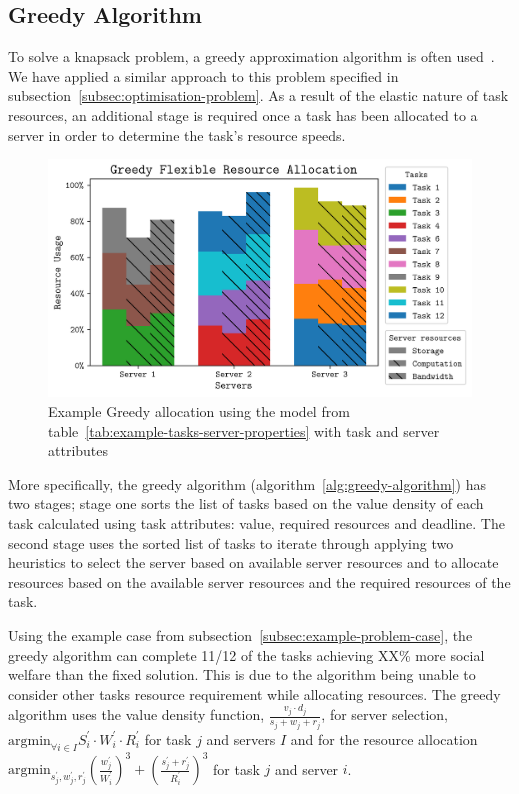 \subsection{Greedy Algorithm}
\label{subsec:greedy-algorithm}
To solve a knapsack problem, a greedy approximation algorithm is often used~\cite{sahni1975approximate}. We have
applied a similar approach to this problem specified in subsection~\ref{subsec:optimisation-problem}. As a result of
the elastic nature of task resources, an additional stage is required once a task has been allocated to a server in
order to determine the task's resource speeds.

\begin{figure}
    \centering
    \includegraphics[width=\linewidth]{figs/allocation/greedy_flexible_resource_allocation.png}
    \caption{Example Greedy allocation using the model from table~\ref{tab:example-tasks-server-properties}
             with task and server attributes}
    \label{fig:example-greedy-allocation}
\end{figure}

More specifically, the greedy algorithm (algorithm~\ref{alg:greedy-algorithm}) has two stages; stage one sorts the list
of tasks based on the value density of each task calculated using task attributes: value, required resources and
deadline. The second stage uses the sorted list of tasks to iterate through applying two heuristics to select the
server based on available server resources and to allocate resources based on the available server resources and the
required resources of the task.

Using the example case from subsection~\ref{subsec:example-problem-case}, the greedy algorithm can complete 11/12 of
the tasks achieving XX\% more social welfare than the fixed solution. This is due to the algorithm being unable to %
consider other tasks resource requirement while allocating resources. The greedy algorithm uses the value density
function, $\frac{v_j \cdot d_j}{s_j + w_j + r_j}$, for server selection,
$\text{argmin}_{\forall i \in I} S^{'}_i \cdot W^{'}_i \cdot R^{'}_i$ for task $j$ and servers $I$ and for the resource allocation
$\text{argmin}_{s^{'}_j, w^{'}_j, r^{'}_j} \left(\frac{w^{'}_j}{W^{'}_i}\right)^3 + \left(\frac{s^{'}_j + r^{'}_j}{R^{'}_i}\right)^3$
for task $j$ and server $i$.

